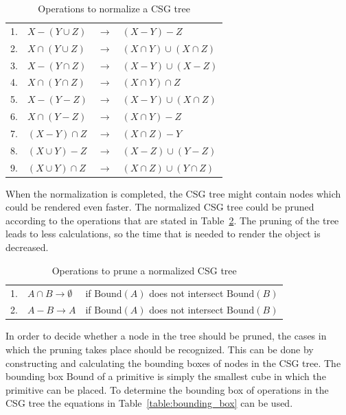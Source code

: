 \documentclass[a4wide,10pt,twocolumn]{article}
\newcommand{\Bound}{\mbox{Bound}}
\begin{document}
    \begin{table}[h]
        \begin{tabular}{llll}
            1. & $X - (Y \cup Z)$    & $\rightarrow$ & $(X - Y) - Z$\\
            2. & $X \cap (Y \cup Z)$ & $\rightarrow$ & $(X \cap Y) \cup (X \cap Z)$\\
            3. & $X - (Y \cap Z)$    & $\rightarrow$ & $(X - Y) \cup (X - Z)$\\
            4. & $X \cap (Y \cap Z)$ & $\rightarrow$ & $(X \cap Y) \cap Z$\\
            5. & $X - (Y - Z)$       & $\rightarrow$ & $(X - Y) \cup (X \cap Z)$\\
            6. & $X \cap (Y - Z)$    & $\rightarrow$ & $(X \cap Y) - Z$\\
            7. & $(X - Y) \cap Z$    & $\rightarrow$ & $(X \cap Z) - Y$\\
            8. & $(X \cup Y) - Z$    & $\rightarrow$ & $(X - Z) \cup (Y - Z)$\\
            9. & $(X \cup Y) \cap Z$ & $\rightarrow$ & $(X \cap Z) \cup (Y \cap Z)$\\
        \end{tabular}
        \caption{Operations to normalize a CSG tree}
        \label{table:normalize}
    \end{table}

    When the normalization is completed, the CSG tree might contain nodes which could be rendered even faster. The normalized CSG tree could be pruned according to the operations that are stated in Table~\ref{table:prune}. The pruning of the tree leads to less calculations, so the time that is needed to render the object is decreased.

    \begin{table}[h]
        \hspace{-0.8em}
        \begin{tabular}{p{} p{} p{} }
            1. & $A \cap B \rightarrow \emptyset$ & if $\Bound(A)$ does not intersect $\Bound(B)$\\
            2. & $A - B \rightarrow A$            & if $\Bound(A)$ does not intersect $\Bound(B)$\\
        \end{tabular}
        \caption{Operations to prune a normalized CSG tree}
        \label{table:prune}
    \end{table}

    In order to decide whether a node in the tree should be pruned, the cases in which the pruning takes place should be recognized. This can be done by constructing and calculating the bounding boxes of nodes in the CSG tree. The bounding box $\Bound$ of a primitive is simply the smallest cube in which the primitive can be placed. To determine the bounding box of operations in the CSG tree the equations in Table~\ref{table:bounding_box} can be used.
\end{document}
